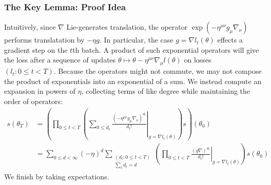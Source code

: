 \documentclass{article}
\newcommand{\wrap}[1]{\left(#1\right)}
\begin{document}
        \subsubsection*{The Key Lemma: Proof Idea}
            Intuitively, since $\nabla$ Lie-generates translation, the operator
            $
                \exp\wrap{
                    -\eta^{\mu\nu} g_\mu \nabla_\nu
                }
            $
            performs translatation by $-\eta g$.  In particular, the case
            $g=\nabla l_t(\theta)$ effects a gradient step on the $t$th batch.
            A product of such exponential operators will give the loss after a
            sequence of updates $\theta \mapsto \theta - \eta^{\mu\nu}
            \nabla_\mu l(\theta)$ on losses $(l_t: 0\leq t < T)$.  Because the
            operators might not commute, we may not compose the product of
            exponentials into an exponential of a sum.  We instead compute an
            expansion in powers of $\eta$, collecting terms of like degree
            while maintaining the order of operators:
            \begin{align*}
                s(\theta_T)
                &=
                \wrap{\prod_{0\leq t<T} \wrap{
                    \sum_{0\leq d_t}
                        \left.
                            \frac{(-\eta^{\mu\nu} g_\mu \nabla_\nu)^{d_t}}{d_t!}
                        \right|_{g=\nabla l_t(\theta)}
                }
                s} (\theta_0) \\
                &= 
                \sum_{0\leq d < \infty} (-\eta)^d
                \sum_{\substack{(d_t: 0\leq t<T) \\ \sum_t d_t = d}}
                \wrap{
                    \prod_{0 \leq t < T} \left.
                        \frac{(g \nabla)^{d_t}}{d_t!}
                    \right|_{g=\nabla l_t(\theta)}
                } s (\theta_0)
            \end{align*}
            We finish by taking expectations.
\end{document}

